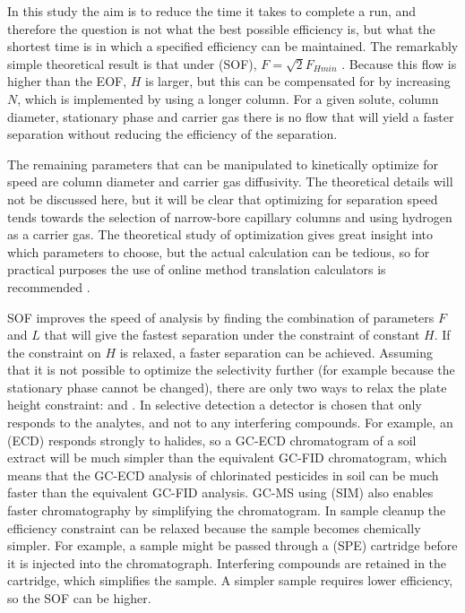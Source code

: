 In this study the aim is to reduce the time it takes to complete a run, and
therefore the question is not what the best possible efficiency is, but what the
shortest time is in which a specified efficiency can be maintained. The
remarkably simple theoretical result is that under  (SOF), \(F = \sqrt{2}F_{Hmin}\) \autocite{Blumberg1997}. Because this flow
is higher than the EOF, \(H\) is larger, but this can be compensated for by
increasing \(N\), which is implemented by using a longer column. For a given
solute, column diameter, stationary phase and carrier gas there is no flow that
will yield a faster separation without reducing the efficiency of the separation.

The remaining parameters that can be manipulated to kinetically optimize for
speed are column diameter and carrier gas diffusivity. The theoretical details
will not be discussed here, but it will be clear that optimizing for separation
speed tends towards the selection of narrow-bore capillary columns and using
hydrogen as a carrier gas. The theoretical study of optimization gives great
insight into which parameters to choose, but the actual calculation can be
tedious, so for practical purposes the use of online method translation
calculators is recommended \autocite{Restek2014}. 


SOF improves the speed of analysis by finding the combination of parameters
\(F\) and \(L\) that will give the fastest separation under the constraint of
constant \(H\). If the constraint on \(H\) is relaxed, a faster separation can
be achieved. Assuming that it is not possible to optimize the selectivity
further (for example because the stationary phase cannot be changed), there are
only two ways to relax the plate height constraint:  and . In selective detection a detector is
chosen that only responds to the analytes, and not to any interfering compounds.
For example, an  (ECD) responds strongly to
halides, so a GC-ECD chromatogram of a soil extract will be much simpler than
the equivalent GC-FID chromatogram, which means that the GC-ECD analysis of
chlorinated pesticides in soil can be much faster than the equivalent GC-FID
analysis. GC-MS using  (SIM) also enables faster
chromatography by simplifying the chromatogram. In sample cleanup the efficiency
constraint can be relaxed because the sample becomes chemically simpler. For
example, a sample might be passed through a 
(SPE) cartridge before it is injected into the chromatograph. Interfering
compounds are retained in the cartridge, which simplifies the sample. A simpler
sample requires lower efficiency, so the SOF can be higher.

